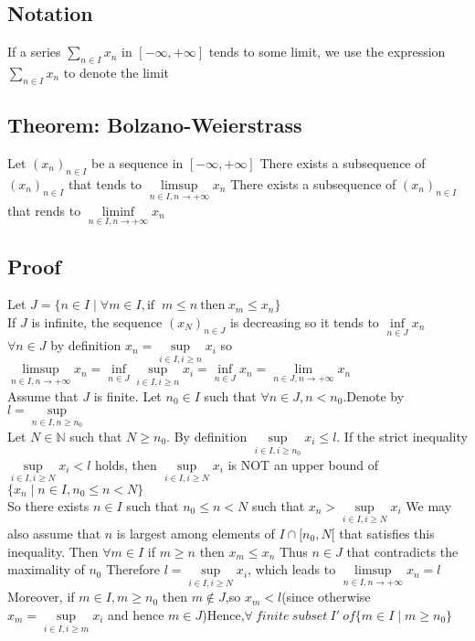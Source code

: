 \documentclass{book}
\begin{document}
\subsection{Notation}
If a series $\sum\limits_{n\in I}x_n$ in $[-\infty,+\infty]$ tends to some limit, we use the expression $\sum\limits_{n\in I}x_n$ to denote the limit
\subsection{Theorem: Bolzano-Weierstrass}
Let $(x_n)_{n\in I}$ be a sequence in $[-\infty,+\infty]$ There exists a subsequence of $(x_n)_{n\in I}$ that tends to $\limsup\limits_{n\in I,n\rightarrow +\infty}x_n$ There exists a subsequence of $(x_n)_{n\in I}$ that rends to $\liminf\limits_{n\in I,n\rightarrow +\infty}x_n$
\subsection{Proof}
Let $J=\{n\in I \mid \forall m\in I,\text{if }\ m\leq n\ \text{then}\ x_m\leq x_n\}$\\
\indent If $J$ is infinite, the sequence $(x_N)_{n\in J}$ is decreasing so it tends to $\inf\limits_{n\in J}x_n$\\
\indent $\forall n\in J$ by definition $x_n=\sup\limits_{i\in I,i\geq n}x_i$ so $\limsup\limits_{n\in I,n\rightarrow+\infty}x_n=\inf\limits_{n\in J}\sup\limits_{i\in I,i\geq n}x_i=\inf\limits_{n\in J}x_n=\lim\limits_{n\in J,n\rightarrow+\infty}x_n$\\
\indent Assume that $J$ is finite. Let $n_0\in I$ such that $\forall n\in J,n<n_0$.Denote by $l=\sup\limits_{n\in I,n\geq n_0}$\\\indent 
Let $N\in\mathbb{N}$ such that $N\geq n_0$. By definition $\sup\limits_{i\in  I,i\geq n_0}x_i\leq l$. If the strict inequality $\sup\limits_{i\in I,i\geq N}x_i<l$ holds, then $\sup\limits_{i\in I,i\geq N}x_i$ is NOT an upper bound of $\{x_n\mid n\in I,n_0\leq n<N\}$\\\indent 
So there exists $n\in I$ such that $n_0\leq n<N$ such that $x_n>\sup\limits_{i\in I,i\geq N}x_i$ We may also assume that $n $ is largest among elements of {$I\cap[n_0,N[$} that satisfies this inequality. Then $\forall m\in I$ if $m\geq n$ then $x_m\leq x_n$ Thus $n\in J$ that contradicts the maximality of $n_0$ Therefore $l=\sup\limits_{i\in I,i\geq N}x_i$, which leads to $\limsup\limits_{n\in I,n\rightarrow+\infty}x_n=l$\\\indent 
Moreover, if $m\in I,m\geq n_0$ then $m\not\in J$,so $x_m<l$(since otherwise $x_m=\sup\limits_{i\in I,i\geq m}x_i$ and hence $m\in J$)Hence,$\forall\ finite\ subset\ I'\ of\{m\in I\mid m\geq n_0\}$\\\indent 
\end{document}
